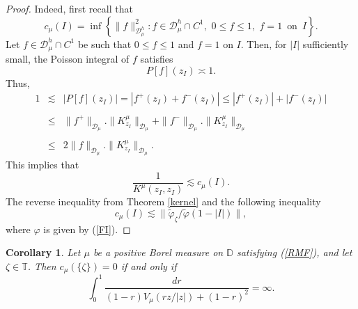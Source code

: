 \documentclass[12pt,reqno,a4paper]{amsart}
\newtheorem{coro}{Corollary}
\newcommand\TT{\mathbb{T}}
\newcommand\DD{\mathbb{D}}
\newcommand{\cD}{{\mathcal{D}}}
\numberwithin{equation}{section}
\begin{document}
	\begin{proof} 
		Indeed, first recall that $$c_{\mu}(I)=\inf\left\lbrace \|f\|^2_{\cD^h_\mu}: f\in \cD^h_\mu \cap C^1, \,\, 0\leq f\leq 1, \,\,f=1\,\,\, \text{on}\,\,\, I \right\rbrace.
		$$
		Let $f \in \mathcal{D}^h_\mu \cap C^1$ be such that $0 \leq f \leq 1$ and $f=1$ on $I$. Then, for $|I|$ sufficiently small, the Poisson integral of $f$ satisfies
		\[
		P[f](z_I)\asymp 1.
		\]Thus, 
		\begin{eqnarray*}
			1&\lesssim& |P[f](z_I)|= |f^+(z_I)+f^-(z_I)| \leq |f^+(z_I)|+|f^-(z_I)| \\
			\\
			&\leq& \|f^+\|_{\cD_\mu}.\|K^{\mu}_{z_I}\|_{\cD_\mu}+\|f^-\|_{\cD_\mu}.\|K^{\mu}_{z_I}\|_{\cD_\mu}\\
			\\
			&\leq& 2\|f\|_{\cD_\mu}.\|K^{\mu}_{z_I}\|_{\cD_\mu}.
		\end{eqnarray*}
		This implies that 
		$$\frac{1}{K^\mu(z_I,z_I)}\lesssim c_{\mu}(I).$$
		The reverse inequality from Theorem \ref{kernel} and the following inequality
		$$c_\mu(I) \lesssim \| \tilde{\varphi}_\zeta/\tilde{\varphi}(1-|I|)\|,$$
		where $\varphi$ is given by (\ref{FI}).
	\end{proof}
	\begin{coro}
		Let $\mu$ be a positive Borel measure on \(\DD\) satisfying (\ref{RMF}), and let $\zeta \in \TT$. Then 
		$c_\mu (\{\zeta\})= 0$ if and only if 
		$$
		\displaystyle \int _0^{1}\frac{dr}{(1-r)V_\mu(rz/|z|)+(1-r)^2}= \infty.
		$$
	\end{coro}
	
\end{document}
